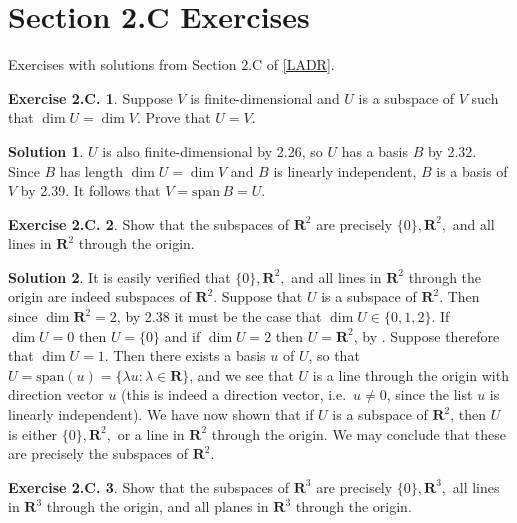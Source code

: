 \documentclass[12pt]{article}
\theoremstyle{definition}
\theoremstyle{exercise}
\newtheorem{exercise}{Exercise 2.C.}
\theoremstyle{solution}
\newtheorem*{solution}{Solution}
\newcommand{\Span}{\text{span}}
\newcommand{\R}{\mathbf{R}}
\begin{document}
\section{Section 2.C Exercises}

Exercises with solutions from Section 2.C of \hyperlink{ladr}{[LADR]}.

\begin{exercise}
\label{ex:1}
    Suppose \( V \) is finite-dimensional and \( U \) is a subspace of \( V \) such that \( \dim U = \dim V \). Prove that \( U = V \).
\end{exercise}

\begin{solution}
    \( U \) is also finite-dimensional by 2.26, so \( U \) has a basis \( B \) by 2.32. Since \( B \) has length \( \dim U = \dim V \) and \( B \) is linearly independent, \( B \) is a basis of \( V \) by 2.39. It follows that \( V = \Span\,B = U \).
\end{solution}

\begin{exercise}
\label{ex:2}
    Show that the subspaces of \( \R^2 \) are precisely \( \{ 0 \}, \R^2, \) and all lines in \( \R^2 \) through the origin.
\end{exercise}

\begin{solution}
    It is easily verified that \( \{ 0 \}, \R^2, \) and all lines in \( \R^2 \) through the origin are indeed subspaces of \( \R^2 \). Suppose that \( U \) is a subspace of \( \R^2 \). Then since \( \dim \R^2 = 2 \), by 2.38 it must be the case that \( \dim U \in \{ 0, 1, 2 \} \). If \( \dim U = 0 \) then \( U = \{ 0 \} \) and if \( \dim U = 2 \) then \( U = \R^2 \), by . Suppose therefore that \( \dim U = 1 \). Then there exists a basis \( u \) of \( U \), so that \( U = \Span(u) = \{ \lambda u : \lambda \in \R \} \), and we see that \( U \) is a line through the origin with direction vector \( u \) (this is indeed a direction vector, i.e.\ \( u \neq 0 \), since the list \( u \) is linearly independent). We have now shown that if \( U \) is a subspace of \( \R^2 \), then \( U \) is either \( \{ 0 \}, \R^2, \) or a line in \( \R^2 \) through the origin. We may conclude that these are precisely the subspaces of \( \R^2 \).
\end{solution}

\begin{exercise}
\label{ex:3}
    Show that the subspaces of \( \R^3 \) are precisely \( \{ 0 \}, \R^3, \) all lines in \( \R^3 \) through the origin, and all planes in \( \R^3 \) through the origin.
\end{exercise}
\end{document}
